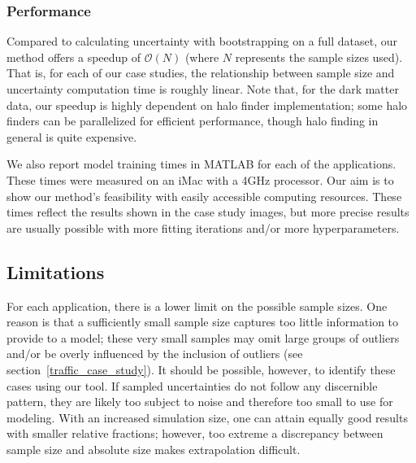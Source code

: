 

\subsubsection{Performance}
Compared to calculating uncertainty with bootstrapping on a full dataset, our method offers a speedup of $\mathcal{O}(N)$ (where $N$ represents the sample sizes used). That is, for each of our case studies, the relationship between sample size and uncertainty computation time is roughly linear. Note that, for the dark matter data, our speedup is highly dependent on halo finder implementation; some halo finders can be parallelized for efficient performance, though halo finding in general is quite expensive.

We also report model training times in MATLAB for each of the applications. These times were measured on an iMac with a 4GHz processor. Our aim is to show our method's feasibility with easily accessible computing resources. These times reflect the results shown in the case study images, but more precise results are usually possible with more fitting iterations and/or more hyperparameters.


\subsection{Limitations}
For each application, there is a lower limit on the possible sample sizes. One reason is that a sufficiently small sample size captures too little information to provide to a model; these very small samples may omit large groups of outliers and/or be overly influenced by the inclusion of outliers (see section~\ref{traffic_case_study}). It should be possible, however, to identify these cases using our tool. If sampled uncertainties do not follow any discernible pattern, they are likely too subject to noise and therefore too small to use for modeling. With an increased simulation size, one can attain equally good results with smaller relative fractions; however, too extreme a discrepancy between sample size and absolute size makes extrapolation difficult.


